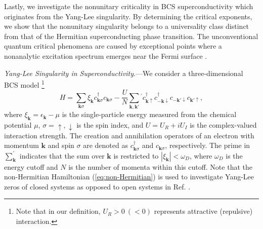 \documentclass[aps,prl,twocolumn,superscriptaddress]{revtex4-1}
\begin{document}
Lastly, we investigate the nonunitary criticality in BCS superconductivity which originates from the Yang-Lee singularity. By determining the critical exponents, we show that the nonunitary singularity belongs to a universality
class distinct from that of the Hermitian superconducting phase transition. The unconventional quantum critical phenomena are caused by exceptional points where a nonanalytic excitation spectrum emerges near the Fermi surface \cite{Yamamoto2019}.

\emph{Yang-Lee Singularity in Superconductivity}.---We consider a three-dimensional
BCS model \cite{Yamamoto2019}\footnote{Note that in our definition, $U_{R}>0\:(<0)$ represents attractive
(repulsive) interaction.} 
\begin{equation}
H=\sum_{\boldsymbol{k}\sigma}\xi_{\boldsymbol{k}}c_{\boldsymbol{k}\sigma}^{\dagger}c_{\boldsymbol{k}\sigma}-\frac{U}{N}\sum_{\bm{k},\bm{k}'}{}^{'}c_{\bm{k}\uparrow}^{\dagger}c_{\bm{-k}\downarrow}^{\dagger}c_{\bm{-k}'\downarrow}c_{\bm{k}'\uparrow},\label{eq:non-Hermitian}
\end{equation}
where $\xi_{\boldsymbol{k}}=\epsilon_{\bm{k}}-\mu$ is the single-particle
energy measured from the chemical potential $\mu$, $\sigma=\uparrow,\downarrow$
is the spin index, and $U=U_{R}+iU_{I}$ is the complex-valued
interaction strength. %
The creation and annihilation operators of an electron with momentum $\bm{k}$ and spin $\sigma$ are denoted as $c_{\bm{k}\sigma}^{\dagger}$
and $c_{\bm{k}\sigma}$, respectively. The prime in $\sum_{\bm{k}}^{'}$
indicates that the sum over $\bm{k}$ is restricted to $|\xi_{\boldsymbol{k}}|<\omega_{D}$,
where $\omega_{D}$ is the energy cutoff and $N$ is the number of momenta within this cutoff. Note that the non-Hermitian Hamiltonian (\ref{eq:non-Hermitian}) is used to investigate Yang-Lee zeros of closed systems as opposed to open systems in Ref. \cite{Yamamoto2019}. 
\end{document}
